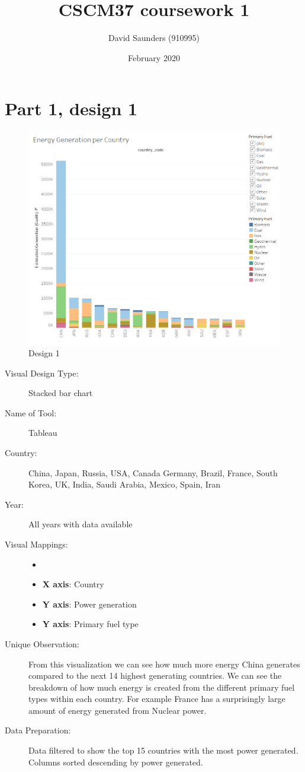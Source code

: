 \documentclass{article}
\title{CSCM37 coursework 1}
\author{David Saunders (910995)}
\date{February 2020}
\begin{document}
\maketitle

\section*{Part 1, design 1}

\begin{figure}[ht]
\centering
\includegraphics[scale=0.6]{Design-1.PNG}
\caption{Design 1}
\end{figure}

\begin{description}
\item[Visual Design Type:]
Stacked bar chart
\item[Name of Tool:]
Tableau
\item[Country:]
China, Japan, Russia, USA, Canada Germany, Brazil, France, South Korea, UK,  India, Saudi Arabia, Mexico, Spain, Iran
\item[Year:]
All years with data available
\item[Visual Mappings:]
\begin{itemize}
    \item[]
    \item \textbf{X axis}: Country
    \item \textbf{Y axis}: Power generation
    \item \textbf{Y axis}: Primary fuel type
\end{itemize} 
\item[Unique Observation:]
From this visualization we can see how much more energy China generates compared to the next 14 highest generating countries. We can see the breakdown of how much energy is created from the different primary fuel types within each country. For example France has a surprisingly large amount of energy generated from Nuclear power.
\item[Data Preparation:]
Data filtered to show the top 15 countries with the most power generated. Columns sorted descending by power generated. 
\end{description}
\end{document}

